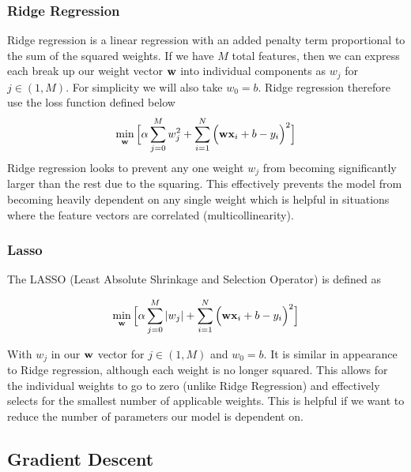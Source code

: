 \subsubsection{Ridge Regression}
Ridge regression is a linear regression with an added penalty term proportional to the sum of the squared weights. If we have $M$ total features, then we can express each break up our weight vector $\textbf{w}$ into individual components as  $w_j$ for $j\in (1,M)$. For simplicity we will also take $w_0 = b$. Ridge regression therefore use the loss function defined below
\begin{align}
    	\min_{\textbf{w}} \Big[\alpha\sum_{j=0}^Mw_j^2 + \sum_{i=1}^N\Big(\textbf{wx}_i +b - y_i\Big)^2 \Big]
\end{align}
Ridge regression looks to prevent any one weight $w_j$ from becoming significantly larger than the rest due to the squaring. This effectively prevents the model from becoming heavily dependent on any single weight which is helpful in situations where the feature vectors are correlated (multicollinearity). 

\subsubsection{Lasso}
The LASSO (Least Absolute Shrinkage and Selection Operator) is defined as 

\begin{align}
    	\min_{\textbf{w}} \Big[\alpha\sum_{j=0}^M|w_j| + \sum_{i=1}^N\Big(\textbf{wx}_i +b - y_i\Big)^2 \Big]
    	\end{align}
    	
With $w_j$ in our $\textbf{w}$ vector for $j\in (1,M)$ and $w_0 = b$. It is similar in appearance to Ridge regression, although each weight is no longer squared. This  allows for the individual weights to go to zero (unlike Ridge Regression) and effectively selects for the smallest number of applicable weights. This is helpful if we want to reduce the number of parameters our model is dependent on.


\subsection{Gradient Descent}\label{grad-descent}

